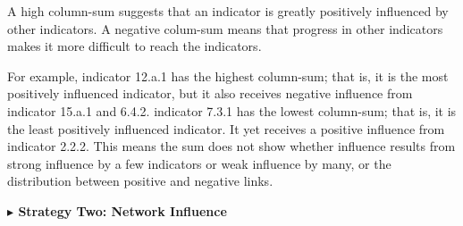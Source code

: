 \documentclass[12pt]{article}  %
\begin{document}
A high column-sum suggests that an indicator is greatly
positively influenced by other indicators. A negative colum-sum means that progress in other indicators makes it more difficult to reach the indicators.



For example, indicator 12.a.1 has the highest column-sum; that is, it is the most positively influenced
indicator, but it also receives negative influence from indicator 15.a.1 and 6.4.2. indicator 7.3.1 has the lowest column-sum; that is,
it is the least positively influenced indicator. It yet receives a
positive influence from indicator 2.2.2.
This means the sum does not show whether
influence results from strong influence by a few indicators or weak influence by many, or the distribution between positive and negative links.


\vspace{0.7mm}\begin{itshape}
\textbf{$\blacktriangleright$ Strategy Two: Network Influence}
    
\end{itshape}
\end{document}
